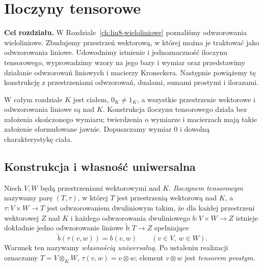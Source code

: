 \chapter{Iloczyny tensorowe}
\label{ch:lin9-iloczyny-tensorowe}

\noindent\textbf{Cel rozdziału.}
W Rozdziale~\ref{ch:lin8-wieloliniowe} poznaliśmy
odwzorowania wieloliniowe. Zbudujemy przestrzeń
wektorową, w której można je traktować jako
odwzorowania liniowe. Udowodnimy istnienie
i jednoznaczność iloczynu tensorowego,
wyprowadzimy wzory na jego bazy i wymiar
oraz przedstawimy działanie odwzorowań
liniowych i macierzy Kroneckera.
Następnie powiążemy tę konstrukcję
z przestrzeniami odwzorowań, dualami,
sumami prostymi i ilorazami.

W całym rozdziale \(K\) jest ciałem,
\(0_K\ne1_K\), a wszystkie przestrzenie
wektorowe i odwzorowania liniowe są nad \(K\).
Konstrukcja iloczynu tensorowego działa
bez założenia skończonego wymiaru;
twierdzenia o wymiarze i macierzach
mają takie założenie sformułowane jawnie.
Dopuszczamy wymiar \(0\) i dowolną
charakterystykę ciała.

\section{Konstrukcja i własność uniwersalna}
\label{sec:lin9-konstrukcja}

\begin{definicja}
\label{def:lin9-tensorowy}
Niech \(V,W\) będą przestrzeniami
wektorowymi nad \(K\).
\emph{Iloczynem tensorowym} nazywamy
parę \((T,\tau)\), w której \(T\) jest
przestrzenią wektorową nad \(K\),
a \(\tau\colon V\times W\to T\) jest
odwzorowaniem dwuliniowym takim, że
dla każdej przestrzeni wektorowej \(Z\)
nad \(K\) i każdego odwzorowania
dwuliniowego \(b\colon V\times W\to Z\)
istnieje dokładnie jedno odwzorowanie
liniowe \(\widetilde b\colon T\to Z\)
spełniające
\[
 \widetilde b(\tau(v,w))=b(v,w)
 \qquad(v\in V,\ w\in W).
\]
Warunek ten nazywamy
\emph{własnością uniwersalną}.
Po ustaleniu realizacji
oznaczamy \(T=V\otimes_KW\),
\(\tau(v,w)=v\otimes w\);
element \(v\otimes w\) jest
\emph{tensorem prostym}.
\end{definicja}


